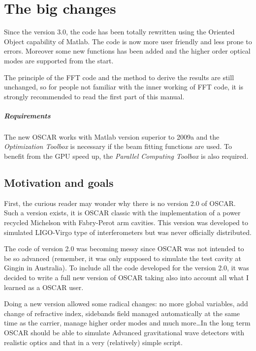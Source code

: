 

\chapter{The big changes}

Since the version 3.0, the code has been totally rewritten using the Oriented Object capability of Matlab. The code is now more user friendly and less prone to errors. Moreover some new functions has been added and the higher order optical modes are supported from the start.

The principle of the FFT code and the method to derive the results are still unchanged, so for people not familiar with the inner working of FFT code, it is strongly recommended to read the first part of this manual.

\paragraph{Requirements} The new OSCAR works with Matlab version superior to 2009a and the \textsl{Optimization Toolbox} is necessary if the beam fitting functions are used. To benefit from the GPU speed up, the \textsl{Parallel Computing Toolbox} is also required.

\section{Motivation and goals}

 First, the curious reader may wonder why there is no version 2.0 of OSCAR. Such a version exists, it is OSCAR classic with the implementation of a power recycled Michelson with Fabry-Perot arm cavities. This version was developed to simulated LIGO-Virgo type of interferometers but was never officially distributed.

 The code of version 2.0 was becoming messy since OSCAR was not intended to be so advanced (remember, it was only supposed to simulate the test cavity at Gingin in Australia). To include all the code developed for the version 2.0, it was decided to write a full new version of OSCAR taking also into account all what I learned as a OSCAR user.

 Doing a new version allowed some radical changes: no more global variables, add change of refractive index, sidebands field managed automatically at the same time as the carrier, manage higher order modes and much more\dots In the long term OSCAR should be able to simulate Advanced gravitational wave detectors with realistic optics and that in a very (relatively) simple script.

